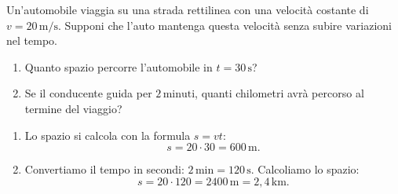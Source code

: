 \begin{question}[ID=1.1, subtitle={Automobile a velocità costante}, tags={mru, legge oraria}, difficulty=facile]
Un'automobile viaggia su una strada rettilinea con una velocità costante di $v = 20 \, \text{m/s}$. Supponi che l'auto mantenga questa velocità senza subire variazioni nel tempo.
\begin{enumerate}
    \item Quanto spazio percorre l'automobile in $t = 30 \, \text{s}$?
    \item Se il conducente guida per $2 \, \text{minuti}$, quanti chilometri avrà percorso al termine del viaggio?
\end{enumerate}
\begin{solution}
    \begin{enumerate}
        \item Lo spazio si calcola con la formula $s = vt$:
        \[
        s = 20 \cdot 30 = 600 \, \text{m}.
        \]
        \item Convertiamo il tempo in secondi: $2 \, \text{min} = 120 \, \text{s}$. Calcoliamo lo spazio:
        \[
        s = 20 \cdot 120 = 2400 \, \text{m} = 2{,}4 \, \text{km}.
        \]
    \end{enumerate}
\end{solution}
\end{question}



